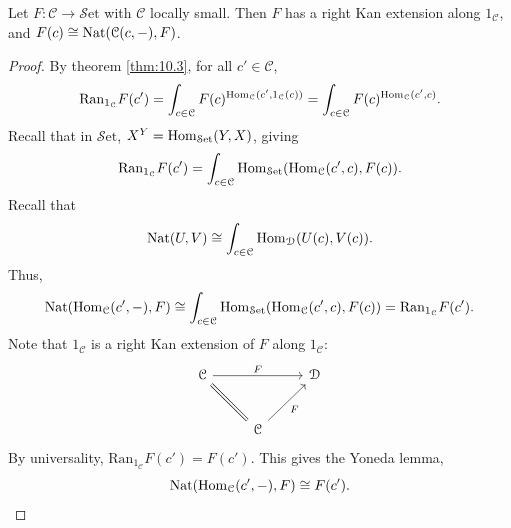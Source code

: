 \begin{theorem}\label{thm:10.7}
	Let $F : \mathcal{C}  \to \mathcal{S} \mathrm{et} $ with $\mathcal{C} $ locally small. Then $F$ has a right Kan extension along $1_\mathcal{C} $, and $F(c)\cong \operatorname{Nat}(\mathcal{C} (c,-),F)$.
\end{theorem}
\begin{proof}
	By theorem \ref{thm:10.3}, for all $c'\in \mathcal{C} $,
	\[
		\mathrm{Ran}_{1_\mathcal{C} } F(c')= \int_{c\in \mathcal{C} } F(c)^{\operatorname{Hom}_{\mathcal{C} }(c', 1_{\mathcal{C} } (c))}=\int_{c\in \mathcal{C} } F(c)^{\operatorname{Hom}_{\mathcal{C} }(c', c)} 
	.\]
	Recall that in $\mathcal{S} \mathrm{et} $, $X^Y=\operatorname{Hom}_{\mathcal{S} \mathrm{et} }(Y, X) $, giving
	\[
		\mathrm{Ran}_{1_{\mathcal{C} } } F(c')=\int_{c\in \mathcal{C} } \operatorname{Hom}_{\mathcal{S} \mathrm{et} }(\operatorname{Hom}_{\mathcal{C} }(c', c) , F(c)) 
	.\]
	Recall that
	\[
		\operatorname{Nat}(U,V)\cong \int_{c\in \mathcal{C} } \operatorname{Hom}_{\mathcal{D} }(U(c), V(c)) 
	.\]
	Thus,
	\[
		\operatorname{Nat}(\operatorname{Hom}_{\mathcal{C} }(c', -) ,F)\cong \int_{c\in \mathcal{C} } \operatorname{Hom}_{\mathcal{S} \mathrm{et} }(\operatorname{Hom}_{\mathcal{C} }(c', c) , F(c)) =\mathrm{Ran}_{1_\mathcal{C} } F(c')
	.\]
	Note that $1_\mathcal{C} $ is a right Kan extension of $F$ along $1_\mathcal{C} $:
	\[\begin{tikzcd}[row sep = 2.5em, column sep = 2.5em]
	\mathcal{C} \ar[" F ", rr] \ar[equals, dr]  &  & \mathcal{D}  \\
	 & \mathcal{C} \ar[" F "', ur]  & 
	\end{tikzcd}\]
	By universality, $\mathrm{Ran} _{1_\mathcal{C} } F(c')=F(c')$. This gives the Yoneda lemma,
	\[
		\operatorname{Nat}(\operatorname{Hom}_{\mathcal{C} }(c', -) ,F)\cong F(c')
	.\]
\end{proof}

